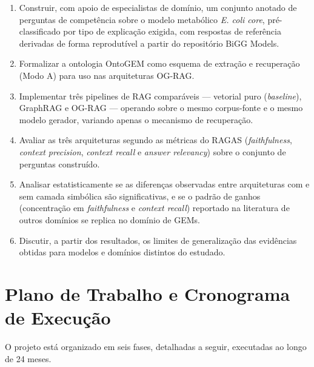 \documentclass{article}
\begin{document}
\begin{enumerate}
	\item Construir, com apoio de especialistas de domínio, um conjunto anotado de perguntas de competência sobre o modelo metabólico \textit{E. coli core}, pré-classificado por tipo de explicação exigida, com respostas de referência derivadas de forma reprodutível a partir do repositório BiGG Models.
	\item Formalizar a ontologia OntoGEM como esquema de extração e recuperação (Modo A) para uso nas arquiteturas OG-RAG.
	\item Implementar três pipelines de RAG comparáveis --- vetorial puro (\textit{baseline}), GraphRAG e OG-RAG --- operando sobre o mesmo corpus-fonte e o mesmo modelo gerador, variando apenas o mecanismo de recuperação.
	\item Avaliar as três arquiteturas segundo as métricas do RAGAS (\textit{faithfulness}, \textit{context precision}, \textit{context recall} e \textit{answer relevancy}) sobre o conjunto de perguntas construído.
	\item Analisar estatisticamente se as diferenças observadas entre arquiteturas com e sem camada simbólica são significativas, e se o padrão de ganhos (concentração em \textit{faithfulness} e \textit{context recall}) reportado na literatura de outros domínios se replica no domínio de GEMs.
	\item Discutir, a partir dos resultados, os limites de generalização das evidências obtidas para modelos e domínios distintos do estudado.
\end{enumerate}

\newpage

\section{Plano de Trabalho e Cronograma de Execução}

O projeto está organizado em seis fases, detalhadas a seguir, executadas ao longo de 24 meses.
\end{document}
